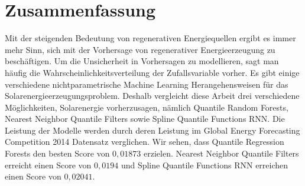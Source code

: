 
\chapter*{Zusammenfassung}

\begin{center}
  \begin{minipage}{12cm}
    \begin{sloppypar}
      Mit der steigenden Bedeutung von regenerativen Energiequellen ergibt es immer mehr Sinn, 
      sich mit der Vorhersage von regenerativer Energieerzeugung zu beschäftigen. 
      Um die Unsicherheit in Vorhersagen zu modellieren, sagt man häufig die Wahrscheinlichkeitsverteilung der 
      Zufallsvariable vorher. Es gibt einige verschiedene nichtparametrische Machine Learning Herangehensweisen 
      für das Solarenergieerzeugungsproblem. Deshalb vergleicht diese Arbeit drei verschiedene Möglichkeiten, Solarenergie 
      vorherzusagen, nämlich Quantile Random Forests, Nearest Neighbor Quantile Filters sowie Spline Quantile Functions RNN. 
      Die Leistung der Modelle werden durch deren Leistung im Global Energy Forecasting Competition 2014 Datensatz verglichen. 
      Wir sehen, dass Quantile Regression Forests den besten Score von \(0,01873\) erzielen. Nearest Neighbor Quantile Filters 
      erreicht einen Score von \(0,0194\) und Spline Quantile Functions RNN erreichen einen Score von \(0,02041\).
    \end{sloppypar}
  \end{minipage}
\end{center}